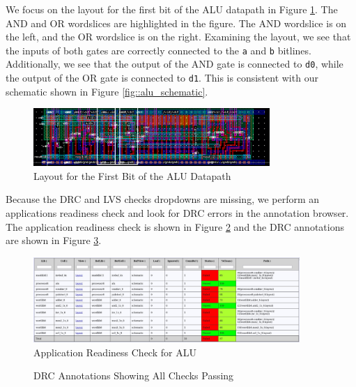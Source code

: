 \documentclass{article}
\begin{document}
	\noindent We focus on the layout for the first bit of the ALU datapath in Figure \ref{fig::alu_layout_bit0}. The AND and OR wordslices are highlighted in the figure. The AND wordslice is on the left, and the OR wordslice is on the right. Examining the layout, we see that the inputs of both gates are correctly connected to the \texttt{a} and \texttt{b} bitlines. Additionally, we see that the output of the AND gate is connected to \texttt{d0}, while the output of the OR gate is connected to \texttt{d1}. This is consistent with our schematic shown in Figure \ref{fig::alu_schematic}.
	
	\begin{figure}[H]
		\centerline{\includegraphics[width=0.8\textwidth]{alu_layout_bit0.png}}
		\caption{Layout for the First Bit of the ALU Datapath}
		\label{fig::alu_layout_bit0}
	\end{figure}
	
	\noindent Because the DRC and LVS checks dropdowns are missing, we perform an applications readiness check and look for DRC errors in the annotation browser. The application readiness check is shown in Figure \ref{fig::alu_application_readiness_check} and the DRC annotations are shown in Figure \ref{fig::alu_drc}.
	
	\begin{figure}[H]
		\centerline{\includegraphics[width=0.9\textwidth]{alu_application_readiness_check.png}}
		\caption{Application Readiness Check for ALU}
		\label{fig::alu_application_readiness_check}
	\end{figure}
	
	\begin{figure}[H]
		\centerline{}
		\caption{DRC Annotations Showing All Checks Passing}
		\label{fig::alu_drc}
	\end{figure}
	
\end{document}
